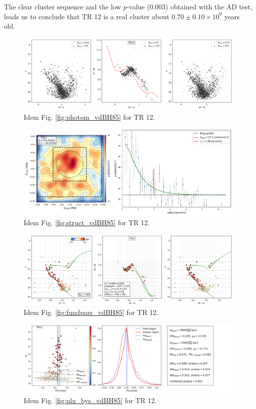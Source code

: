 \documentclass[referee]{aa}
\begin{document}
The clear cluster sequence and the low $p$-value (0.003) obtained with the AD
test, leads us to conclude that TR 12 is a real cluster about
$0.70\pm0.10\times10^9$ years old.

\begin{figure}[ht]
    \centering
    \includegraphics[width=\hsize]{../figs/obs_TR12.png}
    \caption{Idem Fig. \ref{fig:photom_vdBH85} for TR 12.}
    \label{fig19}
\end{figure}
\begin{figure}[ht]
    \centering
    \includegraphics[width=\hsize]{../figs/dmap_trumpler12.png}
    \caption{Idem Fig. \ref{fig:struct_vdBH85} for TR 12.}
    \label{fig20}
\end{figure}
\begin{figure}[ht]
    \centering
    \includegraphics[width=\hsize]{../figs/cmds_tr12.png}
    \caption{Idem Fig. \ref{fig:fundpars_vdBH85} for TR 12.}
    \label{fig21}
\end{figure}
\begin{figure}[ht]
    \centering
    \includegraphics[width=\hsize]{../figs/plx_TR12.png}
    \caption{Idem Fig. \ref{fig:plx_bys_vdBH85} for TR 12.}
    \label{fig22}
\end{figure}
\end{document}
